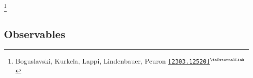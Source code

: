 \documentclass[aspectratio=169,11pt,usenames,dvipsnames]{beamer}
\renewcommand{\thefootnote}{\color{customblue}\faPaperPlaneO}
\newcommand\blfootnote[1]{%
  \begingroup
  \renewcommand\thefootnote{}\footnote{#1}%
  \addtocounter{footnote}{-1}%
  \endgroup
}
\begin{document}
\begin{frame}[noframenumbering]
\begin{columns}[onlytextwidth,t]
\begin{figure}[!hbt]
        \end{figure}
    \end{columns}   
    \blfootnote{\scriptsize Boguslavski, Kurkela, Lappi, Lindenbauer, Peuron \href{https://arxiv.org/abs/2303.12520}{{\color{ForestGreen}\texttt{[2303.12520]}$^\text{\scalebox{0.9}{\faExternalLink}}$}}}
\end{frame}




\subsection{Observables}
\end{document}
